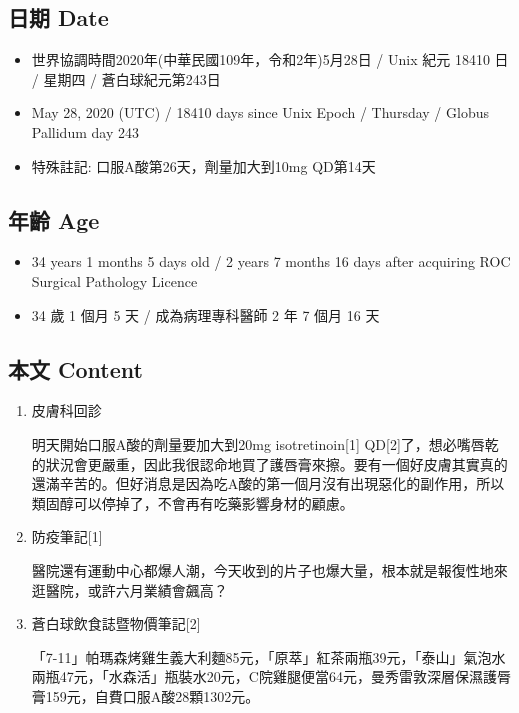 \documentclass[a5paper, 12pt
]{book}
\providecommand{\tightlist}{%
  \setlength{\itemsep}{0pt}\setlength{\parskip}{0pt}}
\begin{document}
\hypertarget{ux65e5ux671f-date-88}{%
\subsection{日期 Date}\label{ux65e5ux671f-date-88}}

\begin{itemize}
\tightlist
\item
  世界協調時間2020年(中華民國109年，令和2年)5月28日 / Unix 紀元 18410 日
  / 星期四 / 蒼白球紀元第243日
\item
  May 28, 2020 (UTC) / 18410 days since Unix Epoch / Thursday / Globus
  Pallidum day 243
\item
  特殊註記: 口服A酸第26天，劑量加大到10mg QD第14天
\end{itemize}

\hypertarget{ux5e74ux9f61-age-88}{%
\subsection{年齡 Age}\label{ux5e74ux9f61-age-88}}

\begin{itemize}
\tightlist
\item
  34 years 1 months 5 days old / 2 years 7 months 16 days after
  acquiring ROC Surgical Pathology Licence
\item
  34 歲 1 個月 5 天 / 成為病理專科醫師 2 年 7 個月 16 天
\end{itemize}

\hypertarget{ux672cux6587-content-88}{%
\subsection{本文 Content}\label{ux672cux6587-content-88}}

\begin{enumerate}
\def\labelenumi{\arabic{enumi}.}
\item
  皮膚科回診

  明天開始口服A酸的劑量要加大到20mg isotretinoin{[}1{]}
  QD{[}2{]}了，想必嘴唇乾的狀況會更嚴重，因此我很認命地買了護唇膏來擦。要有一個好皮膚其實真的還滿辛苦的。但好消息是因為吃A酸的第一個月沒有出現惡化的副作用，所以類固醇可以停掉了，不會再有吃藥影響身材的顧慮。
\item
  防疫筆記{[}1{]}

  醫院還有運動中心都爆人潮，今天收到的片子也爆大量，根本就是報復性地來逛醫院，或許六月業績會飆高？
\item
  蒼白球飲食誌暨物價筆記{[}2{]}

  「7-11」帕瑪森烤雞生義大利麵85元，「原萃」紅茶兩瓶39元，「泰山」氣泡水兩瓶47元，「水森活」瓶裝水20元，C院雞腿便當64元，曼秀雷敦深層保濕護脣膏159元，自費口服A酸28顆1302元。
\end{enumerate}
\end{document}
